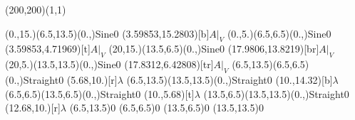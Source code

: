 \unitlength=1bp%

\begin{feynartspicture}(200,200)(1,1)

\FADiagram{}
\FAProp(0.,15.)(6.5,13.5)(0.,){Sine}{0}
\FALabel(3.59853,15.2803)[b]{$A|_V$}
\FAProp(0.,5.)(6.5,6.5)(0.,){Sine}{0}
\FALabel(3.59853,4.71969)[t]{$A|_V$}
\FAProp(20,15.)(13.5,6.5)(0.,){Sine}{0}
\FALabel(17.9806,13.8219)[br]{$A|_V$}
\FAProp(20,5.)(13.5,13.5)(0.,){Sine}{0}
\FALabel(17.8312,6.42808)[tr]{$A|_V$}
\FAProp(6.5,13.5)(6.5,6.5)(0.,){Straight}{0}
\FALabel(5.68,10.)[r]{$\lambda$}
\FAProp(6.5,13.5)(13.5,13.5)(0.,){Straight}{0}
\FALabel(10.,14.32)[b]{$\lambda$}
\FAProp(6.5,6.5)(13.5,6.5)(0.,){Straight}{0}
\FALabel(10.,5.68)[t]{$\lambda$}
\FAProp(13.5,6.5)(13.5,13.5)(0.,){Straight}{0}
\FALabel(12.68,10.)[r]{$\lambda$}
\FAVert(6.5,13.5){0}
\FAVert(6.5,6.5){0}
\FAVert(13.5,6.5){0}
\FAVert(13.5,13.5){0}
\end{feynartspicture}

